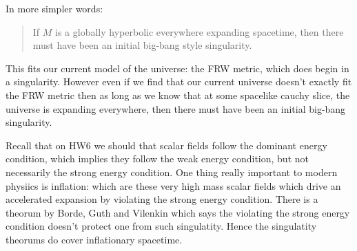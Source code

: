 \documentclass[10pt]{article}
\begin{document}
In more simpler words:

\begin{verse}
If $M$ is a globally hyperbolic everywhere expanding spacetime, then there must have been an initial big-bang style singularity. 
\end{verse}

This fits our current model of the universe: the FRW metric, which does begin in a singularity. However even if we find that our current universe doesn't exactly fit the FRW metric then as long as we know that at some spacelike cauchy slice, the universe is expanding everywhere, then there must have been an initial big-bang singularity. 

Recall that on HW6 we should that scalar fields follow the dominant energy condition, which implies they follow the weak energy condition, but not necessarily the strong energy condition. One thing really important to modern physiics is inflation: which are these very high mass scalar fields which drive an accelerated expansion by violating the strong energy condition. There is a theorum by Borde, Guth and Vilenkin which says the violating the strong energy condition doesn't protect one from such singulatity. Hence the singulatity theorums do cover inflationary spacetime. 
\end{document}
